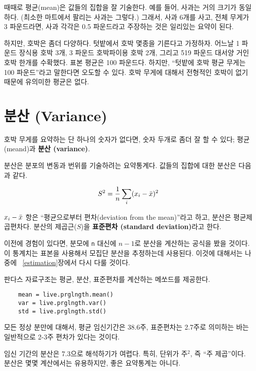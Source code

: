 때때로 평균(mean)은 값들의 집합을 잘 기술한다. 예를 들어, 사과는 거의 크기가 동일하다. (최소한 마트에서 팔리는 사과는 그렇다.)
그래서, 사과 6개를 사고, 전체 무게가 3 파운드라면, 사과 각각은 0.5 파운드라고 주장하는 것은 일리있는 요약이 된다. 


하지만, 호박은 좀더 다양하다. 텃밭에서 호박 몇종을 기른다고 가정하자.
어느날 1 파운드 장식용 호박 3개, 3 파운드 호박파이용 호박 2개, 그리고 519 파운드 대서양 거인 호박 한개를 수확했다.
표본 평균은 100 파운드다. 하지만, ``텃밭에 호박 평균 무게는 100 파운드''라고 말한다면 오도할 수 있다.
호박 무게에 대해서 전형적인 호박이 없기 때문에 유의미한 평균은 없다.



\section{분산 (Variance)}

호박 무게를 요약하는 단 하나의 숫자가 없다면, 숫자 두개로 좀더 잘 할 수 있다; 평균(meand)과 
{\bf 분산 (variance)}.

분산은 분포의 변동과 번위를 기술하려는 요약통계다. 값들의 집합에 대한 분산은 다음과 같다.

%
\[ S^2 = \frac{1}{n} \sum_i (x_i - \bar{x})^2 \]
%

$x_i - \bar{x}$ 항은 ``평균으로부터 편차(deviation from the mean)''라고 하고,
분산은 평균제곱편차다. 분산의 제곱근($S$)을 {\bf 표준편차 (standard deviation)}라고 한다.

이전에 경험이 있다면, 분모에 {\tt n} 대신에 $n-1$로 분산을 계산하는 공식을 봤을 것이다.
이 통계치는 표본을 사용해서 모집단 분산을 추정하는데 사용된다. 이것에 대해서는 나중에 ~\ref{estimation}장에서 
다시 다룰 것이다.

판다스 자료구조는 평균, 분산, 표준편차를 계산하는 메쏘드를 제공한다.

\begin{verbatim}
    mean = live.prglngth.mean()
    var = live.prglngth.var()
    std = live.prglngth.std()
\end{verbatim}

모든 정상 분만에 대해서, 평균 임신기간은 38.6주, 표준편차는 2.7주로 의미하는 바는 일반적으로 2-3주 편차가 있다는 것이다.

임신 기간의 분산은 7.3으로 해석하기가 여렵다. 특히, 단위가 주$^2$, 즉 ``주 제곱''이다.
분산은 몇몇 계산에서는 유용하지만, 좋은 요약통계는 아니다.



